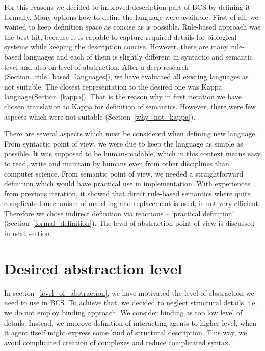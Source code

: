 \documentclass[12pt]{fithesis2}
\begin{document}
For this reasons we decided to improved description part of BCS by defining it formally. Many options how to define the language were available. First of all, we wanted to keep definition space as concise as is possible. Rule-based approach was the best hit, because it is capable to capture required details for biological systems while keeping the description concise. However, there are many rule-based languages and each of them is slightly different in syntactic and semantic level and also on level of abstraction. After a deep research (Section~\ref{rule_based_languages}), we have evaluated all existing languages as not suitable. The closest representation to the desired one was Kappa language(Section~\ref{kappa}). That is the reason why in first iteration we have chosen translation to Kappa for definition of semantics. However, there were few aspects which were not suitable (Section~\ref{why_not_kappa}).

There are several aspects which must be considered when defining new language. From syntactic point of view, we were due to keep the language as simple as possible. It was supposed to be human-readable, which in this context means easy to read, write and maintain by humans even from other disciplines than computer science. From semantic point of view, we needed a straightforward definition which would have practical use in implementation. With experiences from previous iteration, it showed that direct rule-based semantics where quite complicated mechanism of matching and replacement is used, is not very efficient. Therefore we chose indirect definition via reactions -- `practical definition' (Section~\ref{formal_definition}). The level of abstraction point of view is discussed in next section.

\section{Desired abstraction level}

In section~\ref{level_of_abstraction}, we have motivated the level of abstraction we need to use in BCS. To achieve that, we decided to neglect structural details, i.e. we do not employ binding approach. We consider binding as too low level of details. Instead, we improve definition of interacting agents to higher level, when it agent itself might express some kind of structural description. This way, we avoid complicated creation of complexes and reduce complicated syntax.
\end{document}
